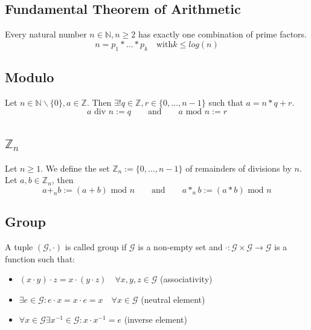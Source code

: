 \hypertarget{fundamental-theorem-of-arithmetic}{%
\subsection{Fundamental Theorem of
Arithmetic}\label{fundamental-theorem-of-arithmetic}}

Every natural number \(n \in \mathbb{N}, n \geq 2\) has exactly one
combination of prime factors.
\[n = p_1 * \dots * p_k \quad \text{with} k \leq log(n)\]

\hypertarget{modulo}{%
\subsection{Modulo}\label{modulo}}

Let \(n \in \mathbb{N}\backslash \{0\}, a \in \mathbb{Z}\). Then
\(\exists !q \in \mathbb{Z}, r \in \{0, \dots, n-1\}\) such that
\(a = n*q + r\).
\[a \text{ div } n := q  \quad\quad\text{and}\quad\quad a \text{ mod } n := r\]

\hypertarget{mathbbz_n}{%
\subsection{\texorpdfstring{\(\mathbb{Z}_n\)}{\textbackslash{}mathbb\{Z\}\_n}}\label{mathbbz_n}}

Let \(n \geq 1\). We define the set
\(\mathbb{Z}_n := \{0, \dots, n-1\}\) of remainders of divisions by
\(n\). Let \(a,b \in \mathbb{Z}_n\), then
\[a +_n b := (a + b) \text{ mod } n \quad\quad\text{and}\quad\quad a *_n b := (a * b) \text{ mod } n\]

\hypertarget{group}{%
\subsection{Group}\label{group}}

A tuple \((\mathcal{G}, \cdot)\) is called group if \(\mathcal{G}\) is a
non-empty set and
\(\cdot : \mathcal{G} \times \mathcal{G} \rightarrow \mathcal{G}\) is a
function such that:

\begin{itemize}
\tightlist
\item
  \((x \cdot y) \cdot z = x \cdot (y \cdot z) \quad\forall x,y,z \in \mathcal{G}\)
  \tab\tab (associativity)
\item
  \(\exists e \in \mathcal{G} : e \cdot x = x \cdot e = x \quad \forall x \in \mathcal{G}\)
  \tab\tab (neutral element)
\item
  \(\forall x \in \mathcal{G} \exists x^{-1} \in \mathcal{G} : x \cdot x^{-1} = e\)
  \tab\tab (inverse element)
\end{itemize}

